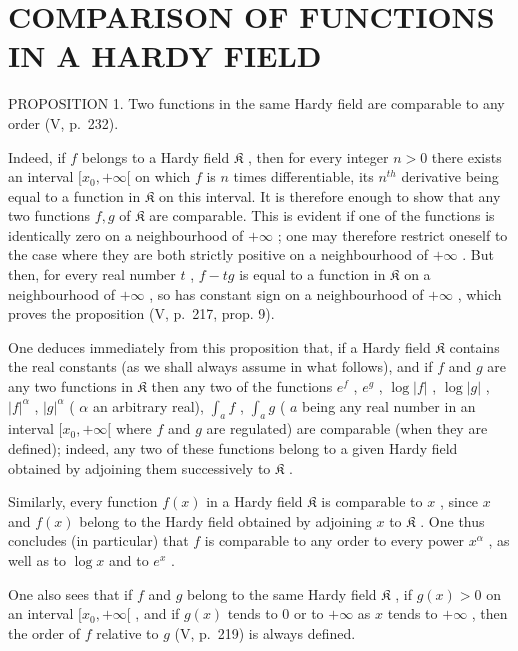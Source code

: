 \section{COMPARISON OF FUNCTIONS IN A HARDY FIELD}

PROPOSITION 1. Two functions in the same Hardy field are comparable to any order (V, p.~232).

Indeed, if \(f\) belongs to a Hardy field \(\mathfrak{K}\) , then for every integer \(n > 0\) there exists an interval \([x_0, +\infty[\) on which \(f\) is \(n\) times differentiable, its \(n^{th}\) derivative being equal to a function in \(\mathfrak{K}\) on this interval. It is therefore enough to show that any two functions \(f, g\) of \(\mathfrak{K}\) are comparable. This is evident if one of the functions is identically zero on a neighbourhood of \(+\infty\) ; one may therefore restrict oneself to the case where they are both strictly positive on a neighbourhood of \(+\infty\) . But then, for every real number \(t\) , \(f - tg\) is equal to a function in \(\mathfrak{K}\) on a neighbourhood of \(+\infty\) , so has constant sign on a neighbourhood of \(+\infty\) , which proves the proposition (V, p.~217, prop. 9).

One deduces immediately from this proposition that, if a Hardy field \(\mathfrak{K}\) contains the real constants (as we shall always assume in what follows), and if \(f\) and \(g\) are any two functions in \(\mathfrak{K}\) then any two of the functions \(e^f\) , \(e^g\) , \(\log |f|\) , \(\log |g|\) , \(|f|^{\alpha}\) , \(|g|^{\alpha}\) ( \(\alpha\) an arbitrary real), \(\int_{a} f\) , \(\int_{a} g\) ( \(a\) being any real number in an interval \([x_0, +\infty[\) where \(f\) and \(g\) are regulated) are comparable (when they are defined); indeed, any two of these functions belong to a given Hardy field obtained by adjoining them successively to \(\mathfrak{K}\) .

Similarly, every function \(f(x)\) in a Hardy field \(\mathfrak{K}\) is comparable to \(x\) , since \(x\) and \(f(x)\) belong to the Hardy field obtained by adjoining \(x\) to \(\mathfrak{K}\) . One thus concludes (in particular) that \(f\) is comparable to any order to every power \(x^{\alpha}\) , as well as to \(\log x\) and to \(e^{x}\) .

One also sees that if \(f\) and \(g\) belong to the same Hardy field \(\mathfrak{K}\) , if \(g(x) > 0\) on an interval \([x_0, +\infty[\) , and if \(g(x)\) tends to 0 or to \(+\infty\) as \(x\) tends to \(+\infty\) , then the order of \(f\) relative to \(g\) (V, p.~219) is always defined.

